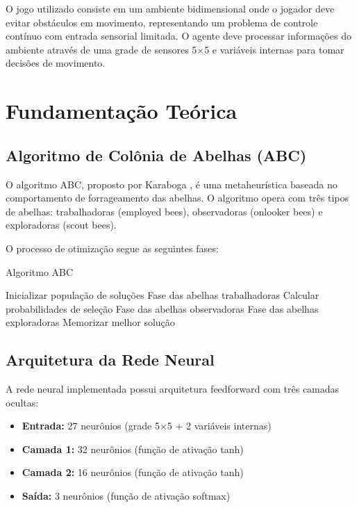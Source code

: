 \documentclass[review]{elsarticle}
\begin{document}
O jogo utilizado consiste em um ambiente bidimensional onde o jogador deve evitar obstáculos em movimento, representando um problema de controle contínuo com entrada sensorial limitada. O agente deve processar informações do ambiente através de uma grade de sensores 5×5 e variáveis internas para tomar decisões de movimento.

\section{Fundamentação Teórica}

\subsection{Algoritmo de Colônia de Abelhas (ABC)}

O algoritmo ABC, proposto por Karaboga \cite{karaboga2005idea}, é uma metaheurística baseada no comportamento de forrageamento das abelhas. O algoritmo opera com três tipos de abelhas: trabalhadoras (employed bees), observadoras (onlooker bees) e exploradoras (scout bees).

O processo de otimização segue as seguintes fases:

\begin{algorithm}
\caption{Algoritmo ABC}
\begin{algorithmic}[1]
\STATE Inicializar população de soluções
    \STATE Fase das abelhas trabalhadoras
    \STATE Calcular probabilidades de seleção
    \STATE Fase das abelhas observadoras
    \STATE Fase das abelhas exploradoras
    \STATE Memorizar melhor solução
\ENDWHILE
\end{algorithmic}
\end{algorithm}

\subsection{Arquitetura da Rede Neural}

A rede neural implementada possui arquitetura feedforward com três camadas ocultas:
\begin{itemize}
\item \textbf{Entrada:} 27 neurônios (grade 5×5 + 2 variáveis internas)
\item \textbf{Camada 1:} 32 neurônios (função de ativação tanh)
\item \textbf{Camada 2:} 16 neurônios (função de ativação tanh)
\item \textbf{Saída:} 3 neurônios (função de ativação softmax)
\end{itemize}
\end{document}

